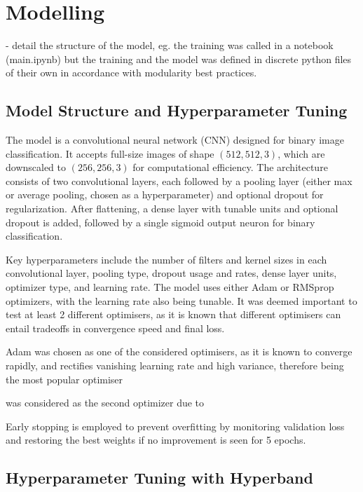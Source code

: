 \section{Modelling}

- detail the structure of the model, eg. the training was called in a notebook (main.ipynb) but the training and the model was defined in discrete python files of their own in accordance with modularity best practices.

\subsection{Model Structure and Hyperparameter Tuning}

The model is a convolutional neural network (CNN) designed for binary image classification. It accepts full-size images of shape $(512, 512, 3)$, which are downscaled to $(256, 256, 3)$ for computational efficiency. The architecture consists of two convolutional layers, each followed by a pooling layer (either max or average pooling, chosen as a hyperparameter) and optional dropout for regularization. After flattening, a dense layer with tunable units and optional dropout is added, followed by a single sigmoid output neuron for binary classification.

Key hyperparameters include the number of filters and kernel sizes in each convolutional layer, pooling type, dropout usage and rates, dense layer units, optimizer type, and learning rate. The model uses either Adam or RMSprop optimizers, with the learning rate also being tunable. It was deemed important to test at least 2 different optimisers, as it is known that different optimisers can entail tradeoffs in convergence speed and final loss.

Adam was chosen as one of the considered optimisers, as it is known to converge rapidly, and rectifies vanishing learning rate and high variance, therefore being the most popular optimiser \cite{RAIAAN2024100470}

 was considered as the second optimizer due to 

Early stopping is employed to prevent overfitting by monitoring validation loss and restoring the best weights if no improvement is seen for 5 epochs.

\subsection{Hyperparameter Tuning with Hyperband}

